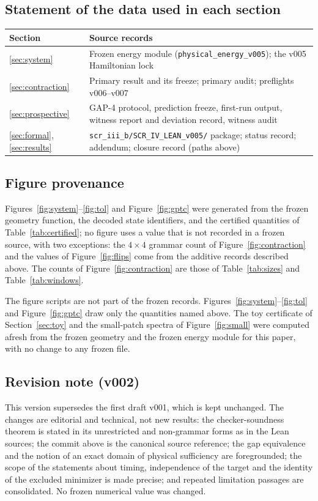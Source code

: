 \documentclass[11pt,a4paper]{article}
\theoremstyle{plain}
\theoremstyle{definition}
\theoremstyle{remark}
\newcommand{\lean}[1]{\nolinkurl{#1}}
\begin{document}
\subsection{Statement of the data used in each section}
\begin{center}\small
\begin{tabularx}{\linewidth}{@{}p{2.3cm}X@{}}
\toprule
Section & Source records\\
\midrule
\ref{sec:system} & Frozen energy module (\lean{physical_energy_v005}); the v005 Hamiltonian lock\\
\ref{sec:contraction} & Primary result and its freeze; primary audit; preflights v006--v007\\
\ref{sec:prospective} & GAP-4 protocol, prediction freeze, first-run output, witness report and deviation record, witness audit\\
\ref{sec:formal}, \ref{sec:results} & \lean{scr_iii_b/SCR_IV_LEAN_v005/} package; status record; addendum; closure record (paths above)\\
\bottomrule
\end{tabularx}
\end{center}

\subsection{Figure provenance}\label{app:figs}
Figures~\ref{fig:system}--\ref{fig:tol} and Figure~\ref{fig:gptc} were generated from the frozen geometry function, the decoded state identifiers, and the certified quantities of Table~\ref{tab:certified}; no figure uses a value that is not recorded in a frozen source, with two exceptions: the $4\times4$ grammar count of Figure~\ref{fig:contraction} and the values of Figure~\ref{fig:flips} come from the additive records described above. The counts of Figure~\ref{fig:contraction} are those of Table~\ref{tab:sizes} and Table~\ref{tab:windows}.

The figure scripts are not part of the frozen records. Figures~\ref{fig:system}--\ref{fig:tol} and Figure~\ref{fig:gptc} draw only the quantities named above. The toy certificate of Section~\ref{sec:toy} and the small-patch spectra of Figure~\ref{fig:small} were computed afresh from the frozen geometry and the frozen energy module for this paper, with no change to any frozen file.

\subsection{Revision note (v002)}
This version supersedes the first draft v001, which is kept unchanged. The changes are editorial and technical, not new results: the checker-soundness theorem is stated in its unrestricted and non-grammar forms as in the Lean sources; the commit above is the canonical source reference; the gap equivalence and the notion of an exact domain of physical sufficiency are foregrounded; the scope of the statements about timing, independence of the target and the identity of the excluded minimizer is made precise; and repeated limitation passages are consolidated. No frozen numerical value was changed.
\end{document}
